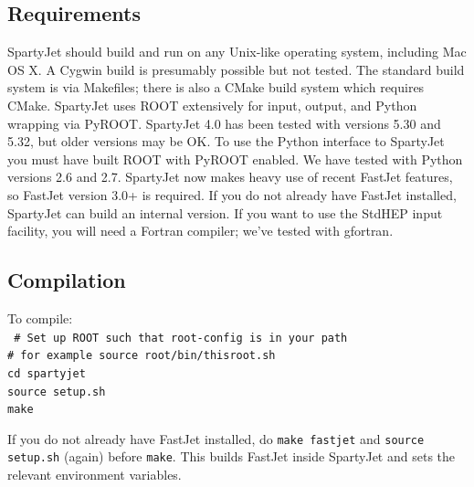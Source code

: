 \documentclass{article}
\newcommand{\prog}[1]{{\sc #1}\xspace}
\newcommand{\code}[1]{{\tt #1}\xspace}
\newcommand{\SJ}[0]{\prog{SpartyJet}}
\newcommand{\FJ}[0]{\prog{FastJet}}
\begin{document}
\subsection{Requirements}

\SJ should build and run on any Unix-like operating system, including Mac OS X. A Cygwin build is presumably possible but not tested.  The standard build system is via Makefiles; there is also a CMake build system which requires CMake.  \SJ uses \prog{ROOT} extensively for input, output, and Python wrapping via PyROOT.  \SJ 4.0 has been tested with versions 5.30 and 5.32, but older versions may be OK.  To use the Python interface to \SJ you must have built \prog{ROOT} with PyROOT enabled.  We have tested with Python versions 2.6 and 2.7.  \SJ now makes heavy use of recent \FJ features, so \FJ version 3.0+ is required.  If you do not already have \FJ installed, \SJ can build an internal version.  If you want to use the StdHEP input facility, you will need a Fortran compiler; we've tested with gfortran.

\subsection{Compilation}

To compile:\\

\code{
\noindent
\# Set up ROOT such that root-config is in your path\\
\# for example source root/bin/thisroot.sh\\
cd spartyjet\\ 
source setup.sh\\
make\\
}

If you do not already have \FJ installed, do \verb+make fastjet+ and \verb+source setup.sh+ (again) before \verb+make+.  This builds  \FJ inside \SJ and sets the relevant environment variables.
\end{document}

